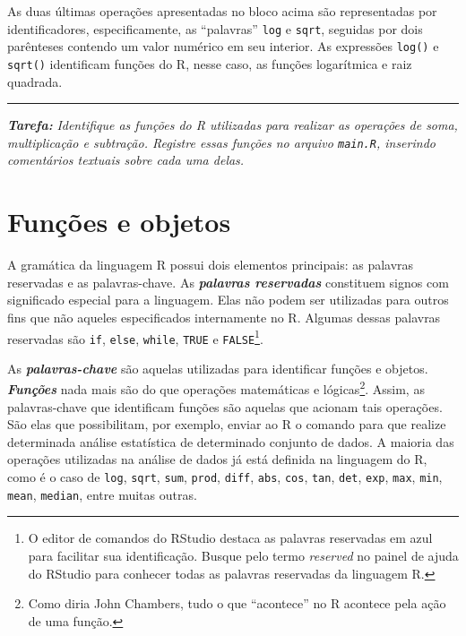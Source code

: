 \documentclass[
]{book}
\begin{document}
As duas últimas operações apresentadas no bloco acima são representadas por identificadores, especificamente, as ``palavras'' \texttt{log} e \texttt{sqrt}, seguidas por dois parênteses contendo um valor numérico em seu interior. As expressões \texttt{log()} e \texttt{sqrt()} identificam funções do R, nesse caso, as funções logarítmica e raiz quadrada.

\begin{center}\rule{0.5\linewidth}{0.5pt}\end{center}

\textbf{\emph{Tarefa:}} \emph{Identifique as funções do R utilizadas para realizar as operações de soma, multiplicação e subtração. Registre essas funções no arquivo \texttt{main.R}, inserindo comentários textuais sobre cada uma delas.}

\hypertarget{funuxe7uxf5es-e-objetos}{%
\chapter{Funções e objetos}\label{funuxe7uxf5es-e-objetos}}

A gramática da linguagem R possui dois elementos principais: as palavras reservadas e as palavras-chave. As \textbf{\emph{palavras reservadas}} constituem signos com significado especial para a linguagem. Elas não podem ser utilizadas para outros fins que não aqueles especificados internamente no R. Algumas dessas palavras reservadas são \texttt{if}, \texttt{else}, \texttt{while}, \texttt{TRUE} e \texttt{FALSE}\footnote{O editor de comandos do RStudio destaca as palavras reservadas em azul para facilitar sua identificação. Busque pelo termo \emph{reserved} no painel de ajuda do RStudio para conhecer todas as palavras reservadas da linguagem R.}.

As \textbf{\emph{palavras-chave}} são aquelas utilizadas para identificar funções e objetos. \textbf{\emph{Funções}} nada mais são do que operações matemáticas e lógicas\footnote{Como diria John Chambers, tudo o que ``acontece'' no R acontece pela ação de uma função.}. Assim, as palavras-chave que identificam funções são aquelas que acionam tais operações. São elas que possibilitam, por exemplo, enviar ao R o comando para que realize determinada análise estatística de determinado conjunto de dados. A maioria das operações utilizadas na análise de dados já está definida na linguagem do R, como é o caso de \texttt{log}, \texttt{sqrt}, \texttt{sum}, \texttt{prod}, \texttt{diff}, \texttt{abs}, \texttt{cos}, \texttt{tan}, \texttt{det}, \texttt{exp}, \texttt{max}, \texttt{min}, \texttt{mean}, \texttt{median}, entre muitas outras.
\end{document}
